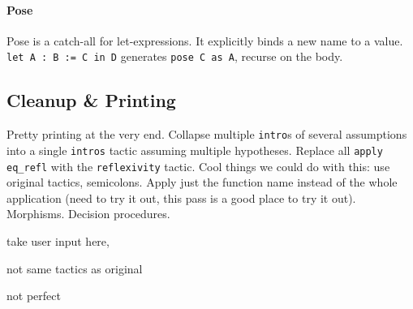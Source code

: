 \paragraph{Pose}
Pose is a catch-all for let-expressions. It explicitly binds a new name to a value.
\lstinline{let A : B := C in D} generates \lstinline{pose C as A}, recurse on the body.

\subsection{Cleanup \& Printing}
\label{sec:second}

Pretty printing at the very end.
Collapse multiple \lstinline{intro}s of several assumptions into a single \lstinline{intros} tactic assuming multiple hypotheses.
Replace all \lstinline{apply eq_refl} with the \lstinline{reflexivity} tactic.
Cool things we could do with this: use original tactics, semicolons. Apply just the function name instead of the whole application (need to try it out, this pass is a good place to try it out). Morphisms. Decision procedures.

take user input here,

not same tactics as original

not perfect




